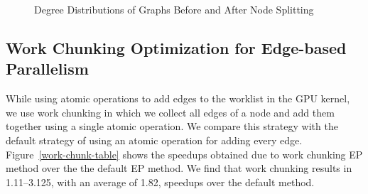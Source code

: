 \begin {figure}
\centering
{}
\caption{Degree Distributions of Graphs Before and After Node Splitting}
\label{ns-degreedist}
\end{figure}


\subsection{Work Chunking Optimization for Edge-based Parallelism}
While using atomic operations to add edges to the worklist in the GPU kernel, we use work chunking in which we collect all edges of a node and add them together using a single atomic operation. 
We compare this strategy with the default strategy of using an atomic operation for adding every edge. 
Figure~\ref{work-chunk-table} shows the speedups obtained due to work chunking EP method over the the default EP method.
We find that work chunking results in 1.11--3.125, with an average of 1.82, speedups over the default method.


